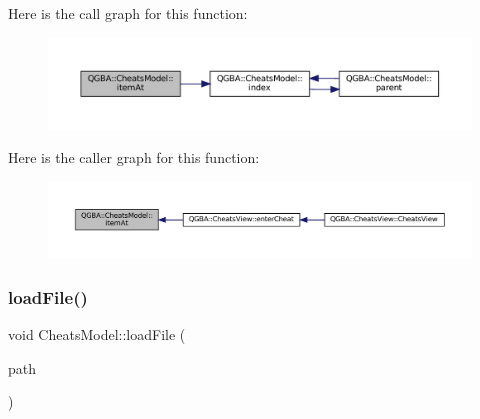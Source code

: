 Here is the call graph for this function\+:
\nopagebreak
\begin{figure}[H]
\begin{center}
\leavevmode
\includegraphics[width=350pt]{class_q_g_b_a_1_1_cheats_model_affb9da60adcba28c5baae235f100b414_cgraph}
\end{center}
\end{figure}
Here is the caller graph for this function\+:
\nopagebreak
\begin{figure}[H]
\begin{center}
\leavevmode
\includegraphics[width=350pt]{class_q_g_b_a_1_1_cheats_model_affb9da60adcba28c5baae235f100b414_icgraph}
\end{center}
\end{figure}
\mbox{\label{class_q_g_b_a_1_1_cheats_model_a0177e1111cf3f303ce64dbb216a5eed3}} 
\subsubsection{\texorpdfstring{load\+File()}{loadFile()}}
{\footnotesize\ttfamily void Cheats\+Model\+::load\+File (\begin{DoxyParamCaption}\item[{const Q\+String \&}]{path }\end{DoxyParamCaption})}

